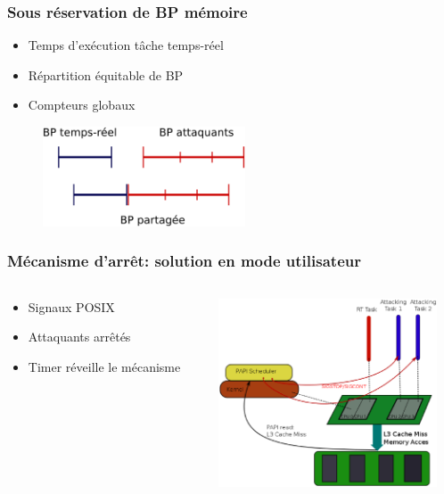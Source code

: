 \documentclass{beamer}
\begin{document}
    \begin{frame}[label=sous-reservation]
        \frametitle{Sous réservation de BP mémoire}
        \begin{itemize}
            \item Temps d'exécution tâche temps-réel
            \item Répartition équitable de BP
            \item Compteurs globaux
        \end{itemize}
        \begin{figure}
            \includegraphics[width=6cm]{doc/schema_bp.eps}
        \end{figure}
    \end{frame}
    
    \begin{frame}[label=mecanisme]
        \frametitle{Mécanisme d'arrêt: solution en mode utilisateur}
        \begin{columns}
            \begin{column}{0.6\textwidth}
                \begin{itemize}
                    \item Signaux POSIX
                    \item Attaquants arrêtés
                    \item Timer réveille le mécanisme
                \end{itemize}
            \end{column}
            \begin{column}{0.8\textwidth}
                \includegraphics[width=6.5cm]{doc/papi_scheduler.eps}
            \end{column}
        \end{columns}
    \end{frame}
\end{document}
